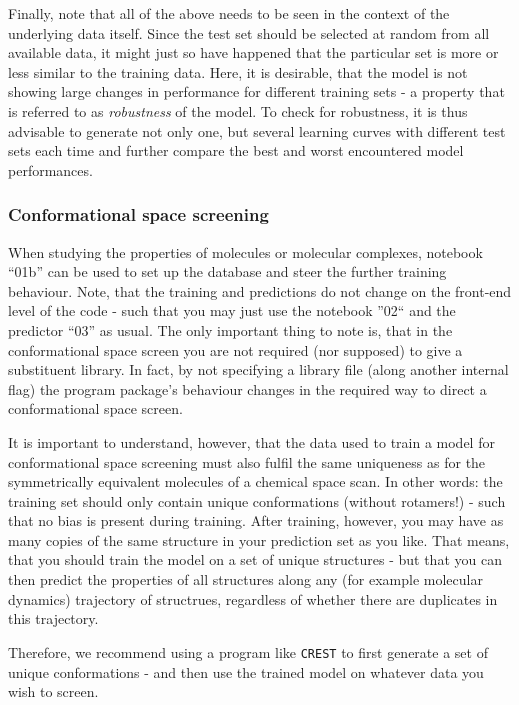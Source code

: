 \documentclass[12pt]{achemso}
\begin{document}
\noindent Finally, note that all of the above needs to be seen in the context of the underlying data itself. Since the test set should be selected at random from all available data, it might just so have happened that the particular set is more or less similar to the training data. Here, it is desirable, that the model is not showing large changes in performance for different training sets - a property that is referred to as \textit{robustness} of the model. To check for robustness, it is thus advisable to generate not only one, but several learning curves with different test sets each time and further compare the best and worst encountered model performances.

\subsubsection{Conformational space screening}

\noindent When studying the properties of molecules or molecular complexes, notebook ``01b'' can be used to set up the database and steer the further training behaviour. Note, that the training and predictions do not change on the front-end level of the code - such that you may just use the notebook ''02`` and the predictor ``03'' as usual. The only important thing to note is, that in the conformational space screen you are not required (nor supposed) to give a substituent library. In fact, by not specifying a library file (along another internal flag) the program package's behaviour changes in the required way to direct a conformational space screen.

\noindent It is important to understand, however, that the data used to train a model for conformational space screening must also fulfil the same uniqueness as for the symmetrically equivalent molecules of a chemical space scan. In other words: the training set should only contain unique conformations (without rotamers!) - such that no bias is present during training. After training, however, you may have as many copies of the same structure in your prediction set as you like. That means, that you should train the model on a set of unique structures - but that you can then predict the properties of all structures along any (for example molecular dynamics) trajectory of structrues, regardless of whether there are duplicates in this trajectory.

\noindent Therefore, we recommend using a program like \texttt{CREST}\cite{C9CP06869D} to first generate a set of unique conformations - and then use the trained model on whatever data you wish to screen.
\end{document}
